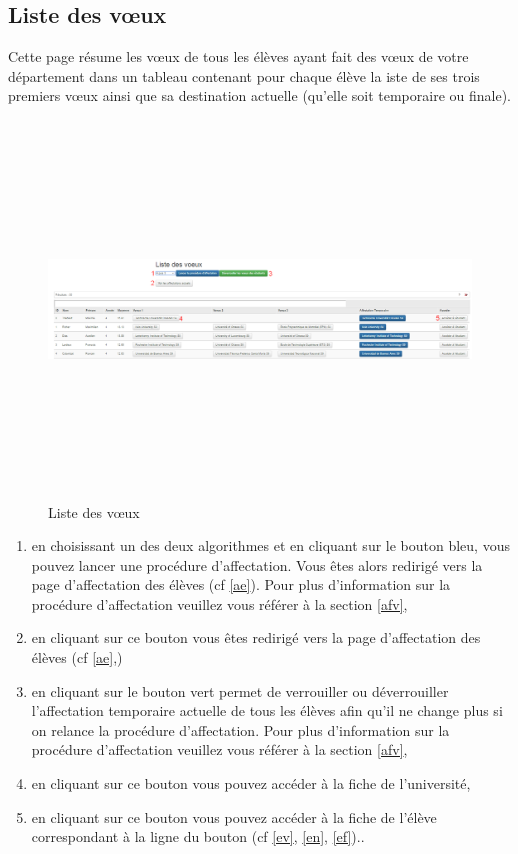    \subsection{Liste des vœux}
   \label{lv}
   Cette page résume les vœux de tous les élèves ayant fait des vœux de votre département dans un tableau contenant pour chaque élève la iste de ses trois premiers vœux ainsi que sa destination actuelle (qu'elle soit temporaire ou finale).
   \begin{figure}[H]
   	\centering
   	\includegraphics[width=18cm,height=10cm]{Images/Admin/liste_voeux_admin.png}
   	\caption{Liste des vœux} 	
   \end{figure}
   \begin{enumerate}
   	\item en choisissant un des deux algorithmes et en cliquant sur le bouton bleu, vous pouvez lancer une procédure d'affectation. Vous êtes alors redirigé vers la page d'affectation des élèves (cf \ref{ae}). Pour plus d'information sur la procédure d'affectation veuillez vous référer à la section \ref{afv},
   	\item en cliquant sur ce bouton vous êtes redirigé vers la page d'affectation des élèves (cf \ref{ae},)
   	\item en cliquant sur le bouton vert permet de verrouiller ou déverrouiller l'affectation temporaire actuelle de tous les élèves afin qu'il ne change plus si on relance la procédure d'affectation. Pour plus d'information sur la procédure d'affectation veuillez vous référer à la section \ref{afv},
   	\item en cliquant sur ce bouton vous pouvez accéder à la fiche de l'université,
   	\item en cliquant sur ce bouton vous pouvez accéder à la fiche de l'élève correspondant à la ligne du bouton (cf \ref{ev}, \ref{en}, \ref{ef})..
	\end{enumerate}
   
